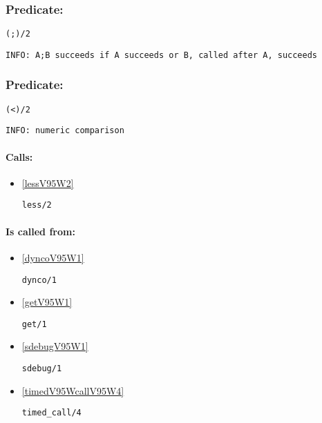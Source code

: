 \subsubsection{Predicate:} \label{V59WV95W2}

\begin{verbatim}
(;)/2
\end{verbatim}

{\small \begin{verbatim}
INFO: A;B succeeds if A succeeds or B, called after A, succeeds

\end{verbatim}}

\subsubsection{Predicate:} \label{V60WV95W2}

\begin{verbatim}
(<)/2
\end{verbatim}

{\small \begin{verbatim}
INFO: numeric comparison

\end{verbatim}}
\paragraph{Calls:} 
\begin{itemize}
\item \ref{lessV95W2} 
\begin{verbatim}
less/2
\end{verbatim}

\end{itemize}
\paragraph{Is called from:} 
\begin{itemize}
\item \ref{dyncoV95W1} 
\begin{verbatim}
dynco/1
\end{verbatim}

\item \ref{getV95W1} 
\begin{verbatim}
get/1
\end{verbatim}

\item \ref{sdebugV95W1} 
\begin{verbatim}
sdebug/1
\end{verbatim}

\item \ref{timedV95WcallV95W4} 
\begin{verbatim}
timed_call/4
\end{verbatim}

\end{itemize}

